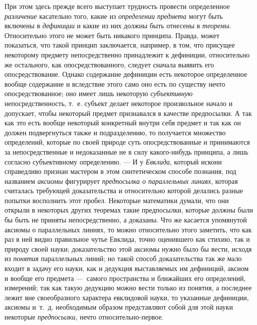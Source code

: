 \documentclass[twoside]{article}
\begin{document}
При этом здесь прежде всего выступает трудность провести
определенное {\em различение}
касательно того, какие из
{\em определении
}{\em предмета} могут
быть включены в {\em дефиниции}
и какие из них должны быть отнесены в
{\em теоремы}.
Относительно этого не может быть никакого принципа. Правда,
может показаться, что такой принцип заключается, например, в том, что
присущее некоторому предмету непосредственно принадлежит к дефиниции,
относительно же остального, как опосредствованного, следует сначала выявить
его опосредствование. Однако содержание дефиниции есть некоторое
определенное вообще содержание и вследствие этого само оно есть по существу
нечто опосредствованное; оно имеет лишь некоторую
{\em субъективную}
непосредственность, т.~е. субъект делает некоторое
произвольное начало и допускает, чтобы некоторый предмет признавался в
качестве предпосылки. А так как это есть вообще некоторый конкретный внутри
себя предмет и так как он должен подвергнуться также и подразделению, то
получается множество определений, которые по своей природе суть
опосредствованные и принимаются за непосредственные и недоказанные не в
силу какого-нибудь принципа, а лишь согласно субъективному определению. —
И у {\em Евклида},
который искони справедливо признан мастером в этом
синтетическом способе познания, под названием
{\em аксиомы} фигурирует
{\em предпосылка о параллельных
линиях}, которая считалась требующей доказательства и
относительно которой делались разные попытки восполнить этот пробел.
Некоторые математики думали, что они открыли в некоторых других теоремах
такие предпосылки, которые должны были бы быть не приняты непосредственно,
а доказаны. Что же касается упомянутой аксиомы о параллельных линиях, то
можно относительно этого заметить, что как раз в ней видно правильное чутье
Евклида, точно оценившего как стихию, так и природу своей науки;
доказательство этой аксиомы нужно было бы вести, исходя из
{\em понятия}
параллельных линий; но такой способ доказательства так же
мало входит в задачу его науки, как и дедукция выставляемых им дефиниций,
аксиом и вообще его предмета —~самого пространства и
ближайших его определений, измерений; так как такую дедукцию можно вести
только из понятия, а последнее лежит вне своеобразного характера евклидовой
науки, то указанные дефиниции, аксиомы и~т.~д. необходимым образом
представляют собой для этой науки некоторые
{\em предпосылки}, нечто
относительно-первое.
\end{document}
